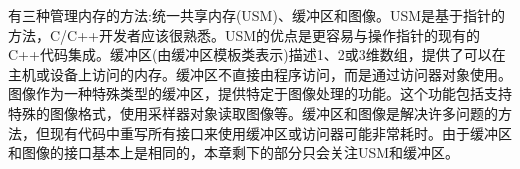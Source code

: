 有三种管理内存的方法:统一共享内存(USM)、缓冲区和图像。USM是基于指针的方法，C/C++开发者应该很熟悉。USM的优点是更容易与操作指针的现有的C++代码集成。缓冲区(由缓冲区模板类表示)描述1、2或3维数组，提供了可以在主机或设备上访问的内存。缓冲区不直接由程序访问，而是通过访问器对象使用。图像作为一种特殊类型的缓冲区，提供特定于图像处理的功能。这个功能包括支持特殊的图像格式，使用采样器对象读取图像等。缓冲区和图像是解决许多问题的方法，但现有代码中重写所有接口来使用缓冲区或访问器可能非常耗时。由于缓冲区和图像的接口基本上是相同的，本章剩下的部分只会关注USM和缓冲区。\par